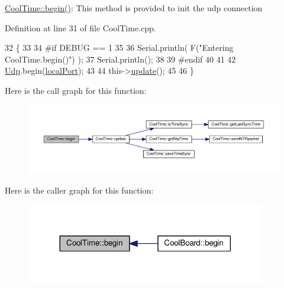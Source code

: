 \hyperlink{class_cool_time_ab1976cf718b950bc31e003c3323b8adb}{Cool\+Time\+::begin()}\+: This method is provided to init the udp connection 

Definition at line 31 of file Cool\+Time.\+cpp.


\begin{DoxyCode}
32 \{
33 
34 \textcolor{preprocessor}{#if DEBUG == 1 }
35 
36     Serial.println( F(\textcolor{stringliteral}{"Entering CoolTime.begin()"}) );
37     Serial.println();
38 
39 \textcolor{preprocessor}{#endif }
40 
41 
42     \hyperlink{class_cool_time_a4e23216a8121ca79d0fb019f30884b92}{Udp}.begin(\hyperlink{class_cool_time_a2f777da44d7ba678be8185299e9b49d1}{localPort});
43     
44     this->\hyperlink{class_cool_time_aae601f795452cfa48d9fb337aed483a8}{update}();
45     
46 \}
\end{DoxyCode}
Here is the call graph for this function\+:\nopagebreak
\begin{figure}[H]
\begin{center}
\leavevmode
\includegraphics[width=350pt]{d6/d49/class_cool_time_ab1976cf718b950bc31e003c3323b8adb_cgraph}
\end{center}
\end{figure}
Here is the caller graph for this function\+:\nopagebreak
\begin{figure}[H]
\begin{center}
\leavevmode
\includegraphics[width=296pt]{d6/d49/class_cool_time_ab1976cf718b950bc31e003c3323b8adb_icgraph}
\end{center}
\end{figure}
\mbox{\label{class_cool_time_a87c28260c1bc77091162cbcf1ee2e129}} 
